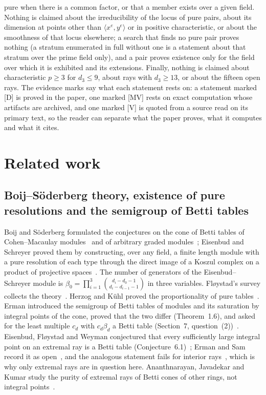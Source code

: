 \documentclass[11pt]{article}
\theoremstyle{definition}
\theoremstyle{remark}
\begin{document}
pure when there is a common factor, or that a member exists over a given field. Nothing is claimed about the irreducibility of the locus of pure pairs, about its dimension at points other than $\langle x^e,y^e\rangle$ or in positive characteristic, or about the smoothness of that locus elsewhere; a search that finds no pure pair proves nothing (a stratum enumerated in full without one is a statement about that stratum over the prime field only), and a pair proves existence only for the field over which it is exhibited and its extensions. Finally, nothing is claimed about characteristic $p\ge3$ for $d_3\le9$, about rays with $d_3\ge13$, or about the fifteen open rays. The evidence marks say what each statement rests on: a statement marked [D] is proved in the paper, one marked [MV] rests on exact computation whose artifacts are archived, and one marked [V] is quoted from a source read on its primary text, so the reader can separate what the paper proves, what it computes and what it cites.

\FloatBarrier
\section{Related work}
\label{sec:related}

\subsection{Boij--\texorpdfstring{S\"oderberg}{Soderberg} theory, existence of pure resolutions and the semigroup of Betti tables}

Boij and S\"oderberg formulated the conjectures on the cone of Betti tables of Cohen--Macaulay modules~\cite{BS08} and of arbitrary graded modules~\cite{BS12}; Eisenbud and Schreyer proved them by constructing, over any field, a finite length module with a pure resolution of each type through the direct image of a Koszul complex on a product of projective spaces~\cite[Theorem~5.1]{ES09}. The number of generators of the Eisenbud--Schreyer module is $\beta_0=\prod_{i=1}^{3}\binom{d_i-d_0-1}{d_i-d_{i-1}-1}$ in three variables. Fl{\o}ystad's survey collects the theory~\cite{Floystad12}. Herzog and K\"uhl proved the proportionality of pure tables~\cite{HK84}. Erman introduced the semigroup of Betti tables of modules and its saturation by integral points of the cone, proved that the two differ (Theorem~1.6), and asked for the least multiple $c_d$ with $c_d\beta_d$ a Betti table (Section~7, question~(2))~\cite{Erman09}. Eisenbud, Fl{\o}ystad and Weyman conjectured that every sufficiently large integral point on an extremal ray is a Betti table (Conjecture~6.1)~\cite{EFW11}; Erman and Sam record it as open~\cite[Section~8]{ES16}, and the analogous statement fails for interior rays~\cite[Example~1.7]{EES13}, which is why only extremal rays are in question here. Ananthnarayan, Javadekar and Kumar study the purity of extremal rays of Betti cones of other rings, not integral points~\cite{AJK26}.
\end{document}
